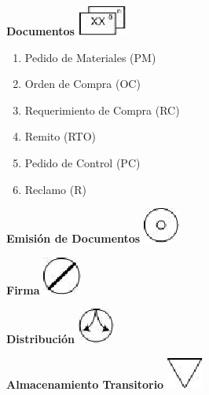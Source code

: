 \begin{center}
  \textbf{Documentos}
  \includegraphics{./Images/Simbolos/simbolo-Documentos.png}
\end{center}
\begin{enumerate}
  \item Pedido de Materiales (PM)
  \item Orden de Compra (OC)
  \item Requerimiento de Compra (RC)
  \item Remito (RTO)
  \item Pedido de Control (PC)
  \item Reclamo (R)
\end{enumerate}

\begin{center}
  \textbf{Emisión de Documentos}
  \includegraphics{./Images/Simbolos/simbolo-Emision-de-Documentos.png}
\end{center}

\begin{center}
  \textbf{Firma}
  \includegraphics{./Images/Simbolos/simbolo-Firma.png}
\end{center}

\begin{center}
  \textbf{Distribución}
  \includegraphics{./Images/Simbolos/simbolo-Distribucion.png}
\end{center}

\begin{center}
  \textbf{Almacenamiento Transitorio}
  \includegraphics{./Images/Simbolos/simbolo-Almacenamiento-Transitorio.png}
\end{center}

